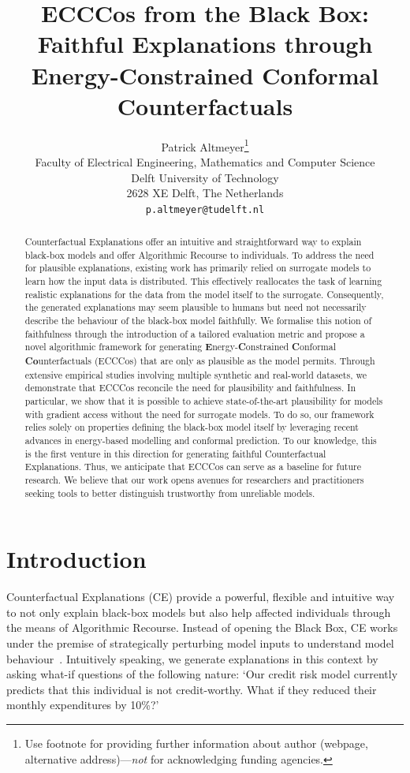\documentclass{article}
\title{ECCCos from the Black Box:\\
Faithful Explanations through\\
Energy-Constrained Conformal Counterfactuals}
\author{%
  Patrick Altmeyer\thanks{Use footnote for providing further information
    about author (webpage, alternative address)---\emph{not} for acknowledging
    funding agencies.} \\
  Faculty of Electrical Engineering, Mathematics and Computer Science\\
  Delft University of Technology\\
  2628 XE Delft, The Netherlands \\
  \texttt{p.altmeyer@tudelft.nl} \\
}
\begin{document}
\maketitle


\begin{abstract}
  Counterfactual Explanations offer an intuitive and straightforward way to explain black-box models and offer Algorithmic Recourse to individuals. To address the need for plausible explanations, existing work has primarily relied on surrogate models to learn how the input data is distributed. This effectively reallocates the task of learning realistic explanations for the data from the model itself to the surrogate. Consequently, the generated explanations may seem plausible to humans but need not necessarily describe the behaviour of the black-box model faithfully. We formalise this notion of faithfulness through the introduction of a tailored evaluation metric and propose a novel algorithmic framework for generating \textbf{E}nergy-\textbf{C}onstrained \textbf{C}onformal \textbf{Co}unterfactuals (ECCCos) that are only as plausible as the model permits. Through extensive empirical studies involving multiple synthetic and real-world datasets, we demonstrate that ECCCos reconcile the need for plausibility and faithfulness. In particular, we show that it is possible to achieve state-of-the-art plausibility for models with gradient access without the need for surrogate models. To do so, our framework relies solely on properties defining the black-box model itself by leveraging recent advances in energy-based modelling and conformal prediction. To our knowledge, this is the first venture in this direction for generating faithful Counterfactual Explanations. Thus, we anticipate that ECCCos can serve as a baseline for future research. We believe that our work opens avenues for researchers and practitioners seeking tools to better distinguish trustworthy from unreliable models.
\end{abstract}

\section{Introduction}\label{intro}

Counterfactual Explanations (CE) provide a powerful, flexible and intuitive way to not only explain black-box models but also help affected individuals through the means of Algorithmic Recourse. Instead of opening the Black Box, CE works under the premise of strategically perturbing model inputs to understand model behaviour~\citep{wachter2017counterfactual}. Intuitively speaking, we generate explanations in this context by asking what-if questions of the following nature: `Our credit risk model currently predicts that this individual is not credit-worthy. What if they reduced their monthly expenditures by 10\%?'
\end{document}

